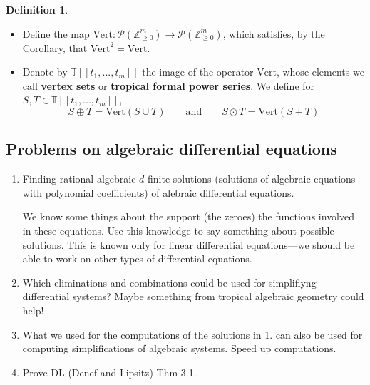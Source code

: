 \documentclass{article}
\theoremstyle{definition}
\newtheorem*{defn}{Definition}
\newcommand{\Z}{\mathbb{Z}}
\newcommand{\T}{\mathbb{T}}
\newcommand{\Ver}{\text{Vert}}
\begin{document}
\begin{defn}\leavevmode
\label{difalgtrop}
    \begin{itemize}
    \item Define the map $\Ver:\mathcal P(\Z_{\geq0}^m)\to\mathcal P(\Z_{\geq0}^m)$, which satisfies, by the Corollary, that $\Ver^2=\Ver$.
    \item Denote by $\T[[t_1,...,t_m]]$ the image of the operator $\Ver$, whose elements we call \textbf{vertex sets} or \textbf{tropical formal power series}. We define for $S,T\in \T[[t_1,...,t_m]]$,
    $$
    S\oplus T=\Ver(S\cup T)\qquad\text{and}\qquad S\odot T=\Ver(S+T)
    $$
    \end{itemize}
\end{defn}
\subsection{Problems on algebraic differential equations}
\begin{enumerate}
    \item Finding rational algebraic $d$ finite solutions (solutions of algebraic equations with polynomial coefficients) of alebraic differential equations.\par
    We know some things about the support (the zeroes) the functions involved in these equations. Use this knowledge to say something about possible solutions. This is known only for linear differential equations—we should be able to work on other types of differential equations.
    \item Which eliminations and combinations could be used for simplifiyng differential systems? Maybe something from tropical algebraic geometry could help!\par
    \item What we used for the computations of the solutions in 1. can also be used for computing simplifications of algebraic systems. Speed up computations.
    \item Prove DL (Denef and Lipsitz) Thm 3.1.
\end{enumerate}
\end{document}
